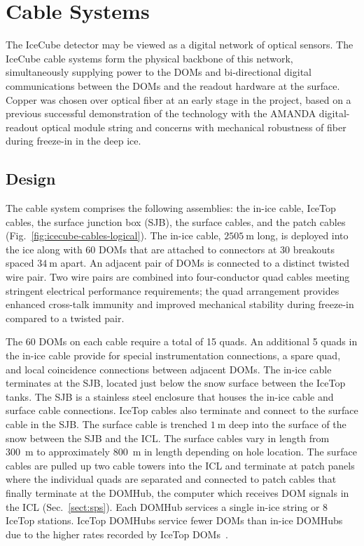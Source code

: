 \section{\label{sec:cable}Cable Systems}

The IceCube detector may be viewed as a digital network of optical
sensors. The IceCube cable systems form the physical backbone of this
network, simultaneously supplying power to the DOMs and bi-directional
digital communications between the DOMs and the readout hardware at the
surface.  Copper was chosen over optical fiber at an early stage in the
project, based on a previous successful demonstration of the technology with
the AMANDA digital-readout optical module string
\cite{AMANDA:string18} and concerns with mechanical robustness of
fiber during freeze-in in the deep ice.

\subsection{Design}

The cable system comprises the following assemblies: the in-ice cable,
IceTop cables, the surface junction box (SJB), the surface cables, and the patch
cables  (Fig.~\ref{fig:icecube-cables-logical}). The in-ice cable, $\SI{2505}{\meter}$ long, is deployed
into the ice along with 60 DOMs that are attached to connectors at 30
breakouts spaced $\SI{34}{\meter}$ apart.  An adjacent pair of DOMs is connected to a distinct
twisted wire pair. Two wire pairs are combined into four-conductor quad
cables meeting stringent electrical performance requirements; the quad
arrangement provides enhanced cross-talk immunity and improved
mechanical stability during freeze-in compared to a twisted pair.

The 60 DOMs on each cable require a total of 15 quads. An additional 5 quads in the
in-ice cable provide for special instrumentation connections, a spare quad,
and local coincidence connections between adjacent DOMs. The in-ice
cable terminates at the SJB, located just below the snow surface between
the IceTop tanks. The SJB is a stainless steel
enclosure that houses the in-ice cable and surface cable
connections. IceTop cables also terminate and connect to the surface cable
in the SJB. The surface cable is trenched $\SI{1}{\meter}$ deep into the
surface of the snow between the SJB and the ICL. The surface
cables vary in length from 300~m to approximately 800~m in length depending on hole location. The surface cables are
pulled up two cable towers into the ICL and terminate at patch panels where the individual
quads are separated and connected to patch cables that finally
terminate at the DOMHub, the computer which receives DOM signals in the ICL (Sec.~\ref{sect:sps}). Each
DOMHub services a single in-ice string or 8 IceTop stations. IceTop DOMHubs service fewer
DOMs than in-ice DOMHubs due to the higher rates recorded by IceTop DOMs~\cite{ICECUBE:IceTop}.

